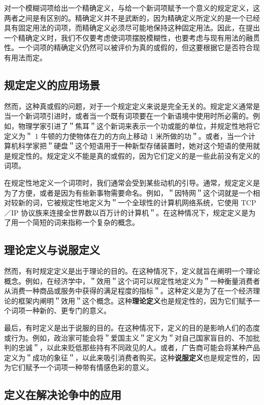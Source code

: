 对一个模糊词项给出一个精确定义，与给一个新词项赋予一个意义的规定定义，这两者之间是有区别的。精确定义并不是武断的，因为精确定义所定义的是一个已经具有固定用法的词项，而精确定义必须尽可能地保持这种固定用法。因此，在提出一个精确定义时，我们不仅要考虑使词项摆脱模糊性，也要考虑与现有用法的融贯性。一个词项的精确定义仍然可以被评价为真的或假的，但这要根据它是否符合现有用法而定。

\subsection{规定定义的应用场景}

然而，这种真或假的问题，对于一个规定定义来说是完全无关的。规定定义通常是当一个新词项引进时，或者当一个既有词项要在一个新语境中使用时所必需的。例如，物理学家引进了＂焦耳＂这个新词来表示一个功或能的单位，并规定性地将它定义为＂ 1 牛顿的力使物体在力的方向上移动 1 米所做的功＂。或者，当一个计算机科学家把＂硬盘＂这个短语用于一种新型存储装置时，她对这个短语的使用就是规定性的。规定定义不能是真的或假的，因为它们定义的是一些此前没有定义的词项。

在规定性地定义一个词项时，我们通常会受到某些动机的引导。通常，规定定义是为了方便，或者是因为有些新事物需要命名。例如，＂因特网＂这个词就是一个相对较新的词，它被规定性地定义为＂一个全球性的计算机网络系统，它使用 TCP／IP 协议族来连接全世界数以百万计的计算机＂。在这种情况下，规定定义是为了用一个简短的词来指称一个复杂的概念。

\subsection{理论定义与说服定义}

然而，有时规定定义是出于理论的目的。在这种情况下，定义就旨在阐明一个理论概念。例如，在经济学中，＂效用＂这个词可以规定性地定义为＂一种衡量消费者从消费一种商品或服务中获得的满足程度的指标＂。这种定义是为了在一个经济理论的框架内阐明＂效用＂这个概念。这种\textbf{理论定义}也是规定性的，因为它们赋予一个词项一种新的、更专门的意义。

最后，有时定义是出于说服的目的。在这种情况下，定义的目的是影响人们的态度或行为。例如，政治家可能会将＂爱国主义＂定义为＂对自己国家盲目的、不加批判的忠诚＂，以此来贬低那些持有不同政见的人。或者，广告商可能会将某种产品定义为＂成功的象征＂，以此来吸引消费者购买。这种\textbf{说服定义}也是规定性的，因为它们赋予一个词项一种带有情感色彩的意义。

\subsection{定义在解决论争中的应用}

